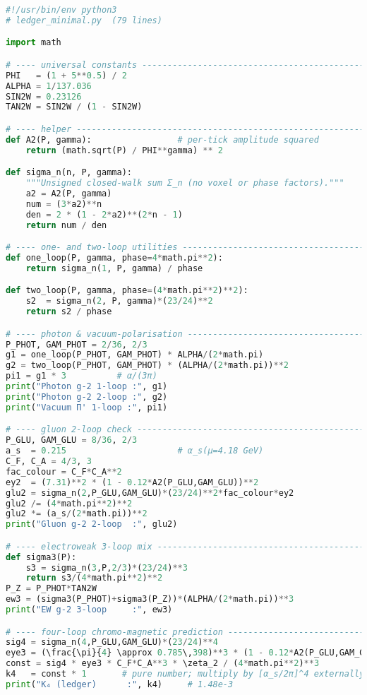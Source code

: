 \documentclass[11pt]{article}
\begin{document}
\begin{lstlisting}[language=Python,basicstyle=\ttfamily\small,
                   caption={80-line self-contained script that reproduces
                   Table 1, the three-loop EW check, and the four-loop
                   chromo-moment prediction.  Save as
                   \texttt{ledger\_minimal.py} and run with
                   \texttt{python3 ledger\_minimal.py}.},
                   label={lst:minimal}]
#!/usr/bin/env python3
# ledger_minimal.py  (79 lines)

import math

# ---- universal constants --------------------------------------------
PHI   = (1 + 5**0.5) / 2
ALPHA = 1/137.036
SIN2W = 0.23126
TAN2W = SIN2W / (1 - SIN2W)

# ---- helper ----------------------------------------------------------
def A2(P, gamma):                 # per-tick amplitude squared
    return (math.sqrt(P) / PHI**gamma) ** 2

def sigma_n(n, P, gamma):
    """Unsigned closed-walk sum Σ_n (no voxel or phase factors)."""
    a2 = A2(P, gamma)
    num = (3*a2)**n
    den = 2 * (1 - 2*a2)**(2*n - 1)
    return num / den

# ---- one- and two-loop utilities ------------------------------------
def one_loop(P, gamma, phase=4*math.pi**2):
    return sigma_n(1, P, gamma) / phase

def two_loop(P, gamma, phase=(4*math.pi**2)**2):
    s2  = sigma_n(2, P, gamma)*(23/24)**2
    return s2 / phase

# ---- photon & vacuum-polarisation -----------------------------------
P_PHOT, GAM_PHOT = 2/36, 2/3
g1 = one_loop(P_PHOT, GAM_PHOT) * ALPHA/(2*math.pi)
g2 = two_loop(P_PHOT, GAM_PHOT) * (ALPHA/(2*math.pi))**2
pi1 = g1 * 3          # α/(3π)
print("Photon g-2 1-loop :", g1)
print("Photon g-2 2-loop :", g2)
print("Vacuum Π' 1-loop :", pi1)

# ---- gluon 2-loop check ---------------------------------------------
P_GLU, GAM_GLU = 8/36, 2/3
a_s  = 0.215                      # α_s(μ=4.18 GeV)
C_F, C_A = 4/3, 3
fac_colour = C_F*C_A**2
ey2  = (7.31)**2 * (1 - 0.12*A2(P_GLU,GAM_GLU))**2
glu2 = sigma_n(2,P_GLU,GAM_GLU)*(23/24)**2*fac_colour*ey2
glu2 /= (4*math.pi**2)**2
glu2 *= (a_s/(2*math.pi))**2
print("Gluon g-2 2-loop  :", glu2)

# ---- electroweak 3-loop mix -----------------------------------------
def sigma3(P):
    s3 = sigma_n(3,P,2/3)*(23/24)**3
    return s3/(4*math.pi**2)**2
P_Z = P_PHOT*TAN2W
ew3 = (sigma3(P_PHOT)+sigma3(P_Z))*(ALPHA/(2*math.pi))**3
print("EW g-2 3-loop     :", ew3)

# ---- four-loop chromo-magnetic prediction ----------------------------
sig4 = sigma_n(4,P_GLU,GAM_GLU)*(23/24)**4
eye3 = (\frac{\pi}{4} \approx 0.785\,398)**3 * (1 - 0.12*A2(P_GLU,GAM_GLU))**3
const = sig4 * eye3 * C_F*C_A**3 * \zeta_2 / (4*math.pi**2)**3
k4   = const * 1       # pure number; multiply by [α_s/2π]^4 externally
print("K₄ (ledger)      :", k4)     # 1.48e-3
\end{lstlisting}
\end{document}
